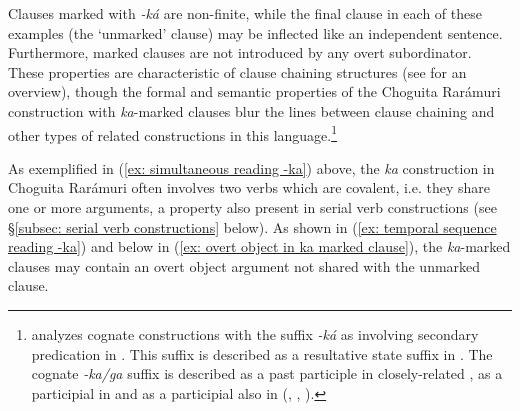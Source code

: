 Clauses marked with \textit{-ká} are non-finite, while the final clause in each of these examples (the `unmarked' clause) may be inflected like an independent sentence. Furthermore, marked clauses are not introduced by any overt subordinator. These properties are characteristic of clause chaining structures (see \citealt{longacre2007sentences} for an overview), though the formal and semantic properties of the Choguita Rarámuri construction with \textit{ka}-marked clauses blur the lines between clause chaining and other types of related constructions in this language.\footnote{\citet{moralesmoreno2016rochecahi} analyzes cognate constructions with the suffix \textit{-ká} as involving secondary predication in . This suffix is described as a resultative state suffix in  \citep{villalpando2019grammatical}. The cognate \textit{-ka/ga} suffix is described as a past participle \citep{miller1996guarijio} in closely-related , as a participial in  \citep{felix2006grammar} and as a participial also in  (\citealt{dedrick1999sonora}, \citealt{guerrero2004yaqui}, \citealt{guerrero2019fenomeno}).}

As exemplified in (\ref{ex: simultaneous reading -ka}) above, the \textit{ka} construction in Choguita Rarámuri often involves two verbs which are covalent, i.e. they share one or more arguments, a property also present in serial verb constructions (see §\ref{subsec: serial verb constructions} below). As shown in (\ref{ex: temporal sequence reading -ka}) and below in (\ref{ex: overt object in ka marked clause}), the \textit{ka}-marked clauses may contain an overt object argument not shared with the unmarked clause.


\ea\label{ex: overt object in ka marked clause}

